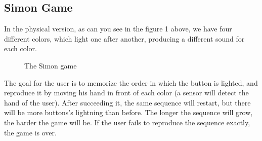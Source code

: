 \documentclass[12pt, openany, twocolumn]{article}
\begin{document}

    \subsection{Simon Game}
    In the physical version, as can you see in the figure 1 above, we have four different colors, which light one after another, producing a different sound for each color.
    \\

    \begin{figure}[H]
        \setlength{\fboxsep}{0pt}
        \setlength{\fboxrule}{1pt}
        \caption{The Simon game}
    \end{figure}

    The goal for the user is to memorize the order in which the button is lighted, and reproduce it by moving his hand in front of each color (a sensor will detect the hand of the user).
    After succeeding it, the same sequence will restart, but there will be more buttons's lightning than before.
    The longer the sequence will grow, the harder the game will be.
    If the user fails to reproduce the sequence exactly, the game is over.
    \\
\end{document}
